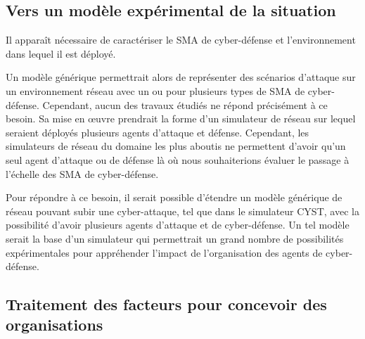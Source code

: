 \subsection{Vers un modèle expérimental de la situation}

Il apparaît nécessaire de caractériser le SMA de cyber-défense
et l'environnement dans lequel il est déployé.%

Un  modèle générique  permettrait alors de représenter des scénarios d'attaque sur un environnement réseau avec un ou pour plusieurs types de SMA de cyber-défense. Cependant, aucun des travaux étudiés ne répond précisément à ce besoin. Sa mise en œuvre prendrait la forme d'un simulateur de réseau sur lequel seraient déployés plusieurs agents d'attaque et défense. Cependant, les simulateurs de réseau du domaine les plus aboutis ne permettent d'avoir qu'un seul agent d'attaque ou de défense là où nous souhaiterions évaluer le passage à l'échelle des SMA de cyber-défense.




Pour répondre à ce besoin, il serait possible d'étendre un modèle générique de réseau pouvant subir une cyber-attaque, tel que dans le simulateur CYST\cite{drasar_session-level_2020},
avec la possibilité d'avoir plusieurs agents d'attaque et de cyber-défense. Un tel modèle serait la base d'un simulateur qui permettrait un grand nombre de possibilités expérimentales pour appréhender l'impact de l'organisation des agents de cyber-défense.


\subsection{Traitement des facteurs pour concevoir des organisations}

